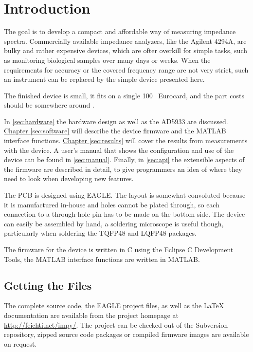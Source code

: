 \chapter{Introduction}

The goal is to develop a compact and affordable way of measuring impedance spectra. Commercially available impedance
analyzers, like the Agilent 4294A, are bulky and rather expensive devices, which are ofter overkill for simple
tasks, such as monitoring biological samples over many days or weeks. When the requirements for accuracy or the covered
frequency range are not very strict, such an instrument can be replaced by the simple device presented here.

The finished device is small, it fits on a single \unit{100 }{\milli\meter} Eurocard, and the part costs
should be somewhere around .

In \autoref{sec:hardware} the hardware design as well as the AD5933 are discussed.
\hyperref[sec:software]{Chapter \ref*{sec:software}} will describe the device firmware and the MATLAB interface
functions.
\hyperref[sec:results]{Chapter \ref*{sec:results}} will cover the results from measurements with the device.
A user's manual that shows the configuration and use of the device can be found in \autoref{sec:manual}.
Finally, in \autoref{sec:api} the extensible aspects of the firmware are described in detail, to give programmers an
idea of where they need to look when developing new features.

The PCB is designed using EAGLE\footnotemark{}. The layout is somewhat convoluted because it is manufactured in-house
and holes cannot be plated through, so each connection to a through-hole pin has to be made on the bottom side.
The device can easily be assembled by hand, a soldering microscope is useful though, particularly when soldering the
TQFP48 and LQFP48 packages.


The firmware for the device is written in C using the Eclipse C Development Tools\footnotemark{}, the MATLAB interface
functions are written in MATLAB.



\section{Getting the Files}

The complete source code, the EAGLE project files, as well as the \LaTeX{} documentation are available from the project
homepage at \url{http://feichti.net/impy/}. The project can be checked out of the Subversion repository, zipped source
code packages or compiled firmware images are available on request.
